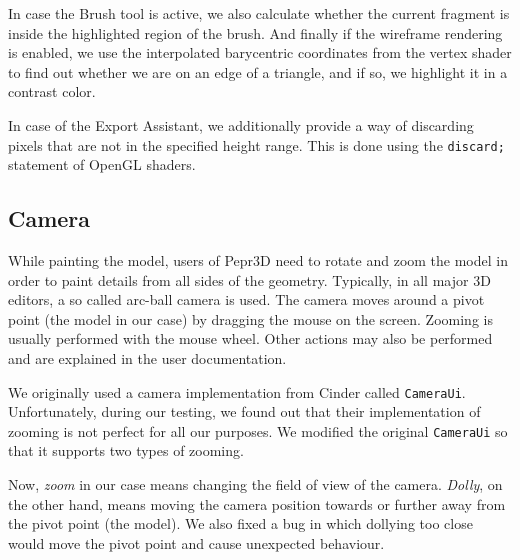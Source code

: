 In case the Brush tool is active, we also calculate whether the current fragment is inside the highlighted region of the brush.
And finally if the wireframe rendering is enabled, we use the interpolated barycentric coordinates from the vertex shader to find out whether we are on an edge of a triangle, and if so, we highlight it in a contrast color.

In case of the Export Assistant, we additionally provide a way of discarding pixels that are not in the specified height range.
This is done using the \texttt{discard;} statement of OpenGL shaders.

\subsection{Camera}

While painting the model, users of Pepr3D need to rotate and zoom the model in order to paint details from all sides of the geometry.
Typically, in all major 3D editors, a so called arc-ball camera is used.
The camera moves around a pivot point (the model in our case) by dragging the mouse on the screen.
Zooming is usually performed with the mouse wheel.
Other actions may also be performed and are explained in the user documentation.

We originally used a camera implementation from Cinder called \texttt{CameraUi}.
Unfortunately, during our testing, we found out that their implementation of zooming is not perfect for all our purposes.
We modified the original \texttt{CameraUi} so that it supports two types of zooming.

Now, \emph{zoom} in our case means changing the field of view of the camera.
\emph{Dolly}, on the other hand, means moving the camera position towards or further away from the pivot point (the model).
We also fixed a bug in which dollying too close would move the pivot point and cause unexpected behaviour.